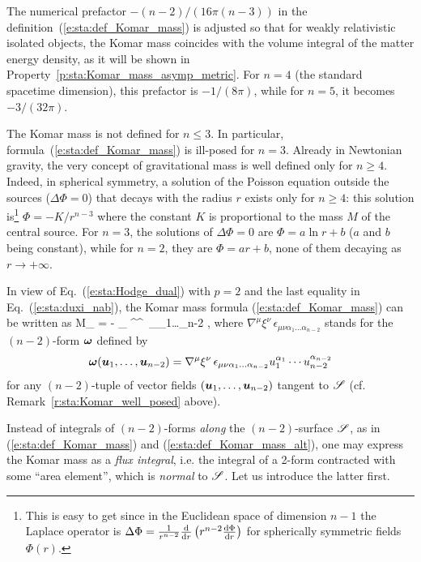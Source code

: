 \begin{remark}
The numerical prefactor $- (n-2)/(16\pi(n-3))$ in the definition~(\ref{e:sta:def_Komar_mass})
is adjusted so that for weakly relativistic isolated objects, the Komar mass coincides
with the volume integral of the matter energy density, as it will be shown in
Property~\ref{p:sta:Komar_mass_asymp_metric}.
For $n=4$ (the standard spacetime dimension), this prefactor is $-1/(8\pi)$,
while for $n=5$, it becomes $-3/(32\pi)$.
\end{remark}

\begin{remark}
The Komar mass is not defined for $n \leq 3$. In particular,
formula~(\ref{e:sta:def_Komar_mass}) is ill-posed for $n=3$.
Already in Newtonian gravity, the very concept of gravitational mass is well defined only
for $n \geq 4$. Indeed, in spherical symmetry,
a solution of the Poisson equation outside the sources ($\Delta \Phi = 0$)
that decays with the radius $r$ exists only for $n \geq 4$: this solution is\footnote{This is easy
to get since in the Euclidean space of dimension $n-1$ the Laplace
operator is $\Delta\Phi = \frac{1}{r^{n-2}} \frac{\mathrm{d} }{\mathrm{d} r} \left( r^{n-2} \frac{\mathrm{d} \Phi}{\mathrm{d} r} \right)$
for spherically symmetric fields $\Phi(r)$.}
$\Phi = - K/r^{n-3}$ where the constant $K$ is proportional to the mass $M$ of the central source.
For $n=3$, the solutions of $\Delta \Phi = 0$ are $\Phi = a \ln r + b$ ($a$ and $b$ being constant), while
for $n=2$, they are $\Phi = a r + b$, none of them decaying as $r\to +\infty$.
\end{remark}

In view of Eq.~(\ref{e:sta:Hodge_dual}) with $p=2$ and the last equality in Eq.~(\ref{e:sta:duxi_nab}),
the Komar mass formula (\ref{e:sta:def_Komar_mass}) can be written as
\be \label{e:sta:def_Komar_mass_alt}
    M_{\Sp} = -   \int_{\Sp}  \nabla^\mu \xi^\nu \,
    \epsilon_{\mu\nu\alpha_1\ldots\alpha_{n-2}} ,
\ee
where $\nabla^\mu \xi^\nu \, \epsilon_{\mu\nu\alpha_1\ldots\alpha_{n-2}}$
stands for the $(n-2)$-form $\bm{\omega}$ defined by
\[
  \bm{\omega}(\bm{u}_1,\ldots,\bm{u}_{n-2}) = \nabla^\mu \xi^\nu \,
\epsilon_{\mu\nu\alpha_1\ldots\alpha_{n-2}} u_1^{\alpha_1} \cdots  u_{n-2}^{\alpha_{n-2}}
\]
for any $(n-2)$-tuple of vector fields $(\bm{u}_1,\ldots,\bm{u}_{n-2})$ tangent to $\mathscr{S}$ (cf. Remark~\ref{r:sta:Komar_well_posed} above).

Instead of integrals of $(n-2)$-forms \emph{along} the $(n-2)$-surface $\mathscr{S}$, as in (\ref{e:sta:def_Komar_mass})
and (\ref{e:sta:def_Komar_mass_alt}), one may
express the Komar mass as a \emph{flux integral}, i.e. the integral of a 2-form
contracted with some ``area element'', which is \emph{normal} to $\mathscr{S}$.
Let us introduce the latter first.

